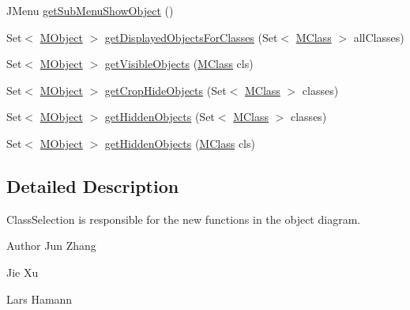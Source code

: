 \begin{DoxyCompactItemize}
\item 
J\-Menu \hyperlink{classorg_1_1tzi_1_1use_1_1gui_1_1views_1_1selection_1_1objectselection_1_1_object_selection_af733e08d31a868af1304d937331cd8f3}{get\-Sub\-Menu\-Show\-Object} ()
\item 
Set$<$ \hyperlink{interfaceorg_1_1tzi_1_1use_1_1uml_1_1sys_1_1_m_object}{M\-Object} $>$ \hyperlink{classorg_1_1tzi_1_1use_1_1gui_1_1views_1_1selection_1_1objectselection_1_1_object_selection_a5fc220c330c23d5b0dd5092c80343b9a}{get\-Displayed\-Objects\-For\-Classes} (Set$<$ \hyperlink{interfaceorg_1_1tzi_1_1use_1_1uml_1_1mm_1_1_m_class}{M\-Class} $>$ all\-Classes)
\item 
Set$<$ \hyperlink{interfaceorg_1_1tzi_1_1use_1_1uml_1_1sys_1_1_m_object}{M\-Object} $>$ \hyperlink{classorg_1_1tzi_1_1use_1_1gui_1_1views_1_1selection_1_1objectselection_1_1_object_selection_a97daa22f645b323b35826ade7525ce1e}{get\-Visible\-Objects} (\hyperlink{interfaceorg_1_1tzi_1_1use_1_1uml_1_1mm_1_1_m_class}{M\-Class} cls)
\item 
Set$<$ \hyperlink{interfaceorg_1_1tzi_1_1use_1_1uml_1_1sys_1_1_m_object}{M\-Object} $>$ \hyperlink{classorg_1_1tzi_1_1use_1_1gui_1_1views_1_1selection_1_1objectselection_1_1_object_selection_ab7349fcac57b30bf29b485d86ce75892}{get\-Crop\-Hide\-Objects} (Set$<$ \hyperlink{interfaceorg_1_1tzi_1_1use_1_1uml_1_1mm_1_1_m_class}{M\-Class} $>$ classes)
\item 
Set$<$ \hyperlink{interfaceorg_1_1tzi_1_1use_1_1uml_1_1sys_1_1_m_object}{M\-Object} $>$ \hyperlink{classorg_1_1tzi_1_1use_1_1gui_1_1views_1_1selection_1_1objectselection_1_1_object_selection_a6c8a39cd3be89ca34e101ec3e0a4bc24}{get\-Hidden\-Objects} (Set$<$ \hyperlink{interfaceorg_1_1tzi_1_1use_1_1uml_1_1mm_1_1_m_class}{M\-Class} $>$ classes)
\item 
Set$<$ \hyperlink{interfaceorg_1_1tzi_1_1use_1_1uml_1_1sys_1_1_m_object}{M\-Object} $>$ \hyperlink{classorg_1_1tzi_1_1use_1_1gui_1_1views_1_1selection_1_1objectselection_1_1_object_selection_a7229fbc3912a9cb0686d78276836466d}{get\-Hidden\-Objects} (\hyperlink{interfaceorg_1_1tzi_1_1use_1_1uml_1_1mm_1_1_m_class}{M\-Class} cls)
\end{DoxyCompactItemize}


\subsection{Detailed Description}
Class\-Selection is responsible for the new functions in the object diagram.

\begin{DoxyAuthor}{Author}
Jun Zhang 

Jie Xu 

Lars Hamann 
\end{DoxyAuthor}



